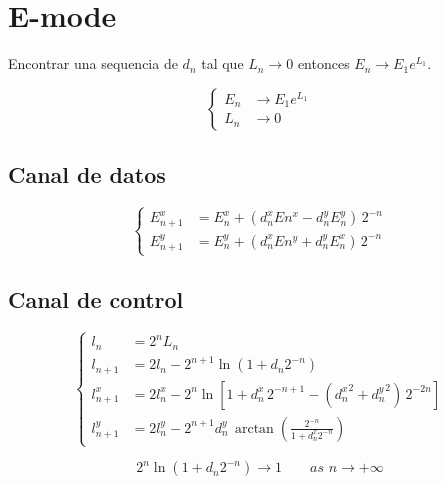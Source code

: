 \documentclass[10pt,a4paper]{book}
\begin{document}
\section{E-mode}

   Encontrar una sequencia de $d_n$ tal que $L_n \rightarrow 0$ entonces $E_n \rightarrow E_1 e^{L_1}$.

\begin{equation} \label{eq:bkm_E_mode}
   \left\{
      \begin{aligned}
         E_n & \rightarrow E_1 e^{L_1} \\
         L_n & \rightarrow 0
      \end{aligned}
   \right.
\end{equation}

   \subsection{Canal de datos}
\begin{equation} \label{eq:bkm_eqs_E}
   \left\{
      \begin{aligned}
         E_{n+1}^x &= E_n^x + ( d_n^x E n^x - d_n^y E_n^y ) \,2^{-n} \\
         E_{n+1}^y &= E_n^y + ( d_n^x E n^y + d_n^y E_n^x ) \,2^{-n}
      \end{aligned}
   \right.
\end{equation}

   \subsection{Canal de control}
\begin{equation} \label{eq:bkm_eqs_l}
   \left\{
      \begin{aligned}
         l_n         &= 2^n L_n                                                                             \\
         l_{n+1}     &= 2 l_n   - 2^{n+1} \ln( 1 + d_n 2^{-n} )                                             \\
         l_{n+1}^x   &= 2 l_n^x - 2^{n}   \ln[ 1 + d_n^x \, 2^{-n+1} - ({d_n^x}^2 + {d_n^y}^2) \, 2^{-2n} ] \\
         l_{n+1}^y   &= 2 l_n^y - 2^{n+1} d_n^y \, \arctan{ \left( \frac{2^{-n}}{1+d_n^x 2^{-n}} \right) }
      \end{aligned}
   \right.
\end{equation}

\begin{equation} \label{eq:bkm_eqs_l_limit}
   2^{n} \ln( 1 + d_n 2^{-n} ) \rightarrow 1 \qquad as \,\, n \rightarrow +\infty
\end{equation}
\end{document}
